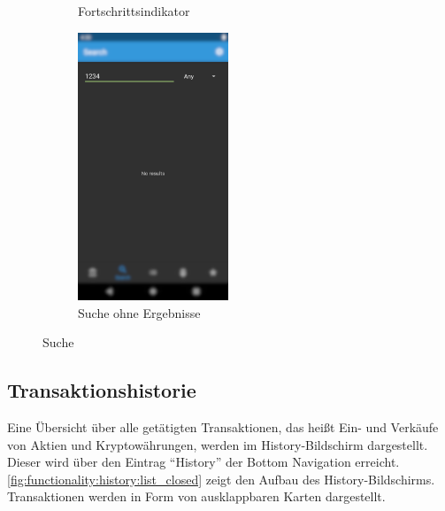 \documentclass[a4paper]{article}
\begin{document}
\begin{figure}[H]
\begin{subfigure}{.5\textwidth}
		\caption{Fortschrittsindikator}
		\label{fig:functionality:search:loading}
	\end{subfigure}
	\begin{subfigure}{.5\textwidth}
		\centering
		\includegraphics[height=8cm,keepaspectratio]{./images/search/no_results.png}
		\caption{Suche ohne Ergebnisse}
		\label{fig:functionality:search:no-results}
	\end{subfigure}
	\caption{Suche}
	\label{fig:functionality:search}
\end{figure}


\subsection{Transaktionshistorie}
\label{subsec:functionality:history}
Eine Übersicht über alle getätigten Transaktionen, das heißt Ein- und Verkäufe von Aktien und Kryptowährungen, werden im History-Bildschirm dargestellt. Dieser wird über den Eintrag "`History"' der Bottom Navigation erreicht. \autoref{fig:functionality:history:list_closed} zeigt den Aufbau des History-Bildschirms. Transaktionen werden in Form von ausklappbaren Karten dargestellt.
\end{document}
